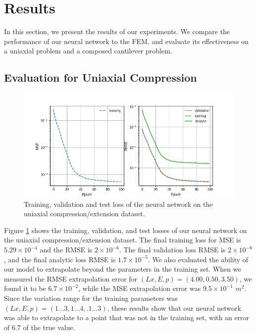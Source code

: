 \documentclass[11pt]{scrartcl} %
\begin{document}
\section{Results}
In this section, we present the results of our experiments. We compare the performance of our neural network to the FEM, and evaluate its effectiveness on a uniaxial problem and a composed cantilever problem.

\subsection{Evaluation for Uniaxial Compression}

\begin{figure}[htpb!]
	\centering
	\includegraphics[width=1\textwidth]{Figures/Example1_losses.png}
	\caption{Training, validation and test loss of the neural network on the uniaxial compression/extension dataset.}
	\label{fig:train_loss}
	\end{figure}
 
Figure \ref{fig:train_loss} shows the training, validation, and test losses of our neural network on the uniaxial compression/extension dataset. The final training loss for MSE is $5.29\times10^{-4}$ and the RMSE is $2\times10^{-6}$. The final validation loss RMSE is $2\times10^{-6}$, and the final analytic loss RMSE is $1.7\times10^{-5}$.
We also evaluated the ability of our model to extrapolate beyond the parameters in the training set. When we measured the RMSE extrapolation error for $(Lx, E, p) = (4.00, 0.50, 3.50)$, we found it to be $6.7\times10^{-2}$, while the MSE extrapolation error was $9.5\times10^{-1}$ $m^2$. Since the variation range for the training parameters was $(Lx, E, p) = (1 \hdots 3, 1 \hdots 4, .1 \hdots 3)$, these results show that our neural network was able to extrapolate to a point that was not in the training set, with an error of 6.7 of the true value.
\end{document}
